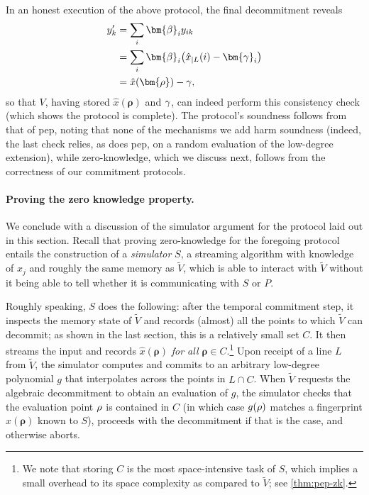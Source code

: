 \documentclass[a4paper,UKenglish,cleveref, autoref, thm-restate]{lipics-v2021}
\theoremstyle{definition}
\newcommand{\pepprotocol}{\textsf{pep}\xspace}
\newcommand{\pcommitstring}{y}
\newcommand{\evaluationpoint}{\bm{\fe2}}
\newcommand{\fingerprinttuple}{\bm{\rho}}
\renewcommand{\line}{L}
\def\fe#1{
    \ifnum#1=1
        \alpha
    \else
    \ifnum#1=2
        \beta
    \else
    \ifnum#1=3
        \gamma
    \fi\fi\fi
}
\def\rfe#1{
    \ifnum#1=1
        \rho
    \else
    \ifnum#1=2
        \sigma
    \else
    \fi\fi
}
\begin{document}
    \iflipics\else\paragraph*{}\fi In an honest execution of the above protocol, the final decommitment reveals
    \begin{align*}
        \pcommitstring'_k &= \sum_i \evaluationpoint_i y_{ik}\\
        &= \sum_i \evaluationpoint_i \big(\hat x_{|\line}(i) - \bm{\fe3}_i\big)\\
        &= \hat x(\fingerprinttuple) - \fe3,
    \end{align*}
    so that $V$, having stored $\hat x(\fingerprinttuple)$ and $\fe3$, can indeed perform this consistency check (which shows the protocol is complete). The protocol's soundness follows from that of \pepprotocol, noting that none of the mechanisms we add harm soundness (indeed, the last check relies, as does \pepprotocol, on a random evaluation of the low-degree extension), while zero-knowledge, which we discuss next, follows from the correctness of our commitment protocols.    
    
    \paragraph*{Proving the zero knowledge property\iflipics\else.\fi}
    We conclude with a discussion of the simulator argument for the protocol laid out in this section. Recall that proving zero-knowledge for the foregoing protocol entails the construction of a \emph{simulator} $S$, a streaming algorithm with knowledge of $x_j$ and roughly the same memory as $\widetilde V$, which is able to interact with $\widetilde V$ without it being able to tell whether it is communicating with $S$ or $P$.
    
    Roughly speaking, $S$ does the following: after the temporal commitment step, it inspects the memory state of $\widetilde V$ and records (almost) all the points to which $\widetilde V$ can decommit; as shown in the last section, this is a relatively small set $C$. It then streams the input and records $\hat x(\fingerprinttuple)$ \emph{for all $\fingerprinttuple \in C$}.\footnote{We note that storing $C$ is the most space-intensive task of $S$, which implies a small overhead to its space complexity as compared to $\widetilde V$; see \cref{thm:pep-zk}.} Upon receipt of a line $\line$ from $\widetilde V$, the simulator computes and commits to an arbitrary low-degree polynomial $g$ that interpolates across the points in $\line \cap C$. When $\widetilde V$ requests the algebraic decommitment to obtain an evaluation of $g$, the simulator checks that the evaluation point $\rfe1$ is contained in $C$ (in which case $g(\rfe1)$ matches a fingerprint $\hat x(\fingerprinttuple)$ known to $S$), proceeds with the decommitment if that is the case, and otherwise aborts.
    
\end{document}
